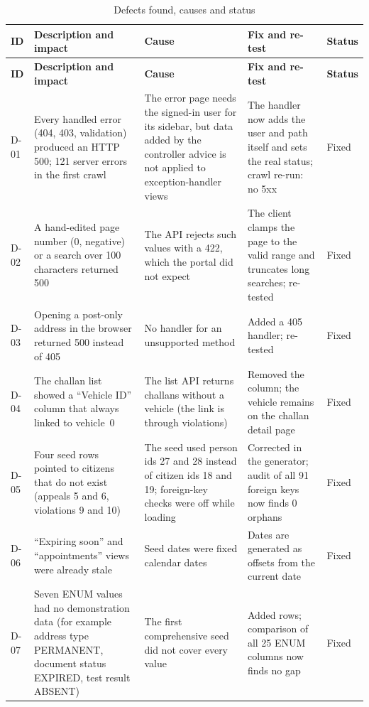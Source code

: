\begingroup\footnotesize
\begin{longtable}{@{}p{0.9cm}p{3.4cm}p{3.7cm}p{3.7cm}p{1.3cm}@{}}
\caption{Defects found, causes and status}\label{tab:defects}\\
\toprule \textbf{ID} & \textbf{Description and impact} & \textbf{Cause} & \textbf{Fix and re-test} & \textbf{Status}\\ \midrule \endfirsthead
\toprule \textbf{ID} & \textbf{Description and impact} & \textbf{Cause} & \textbf{Fix and re-test} & \textbf{Status}\\ \midrule \endhead
\bottomrule \endlastfoot
D-01 & Every handled error (404, 403, validation) produced an HTTP 500; 121 server errors in the first crawl & The error page needs the signed-in user for its sidebar, but data added by the controller advice is not applied to exception-handler views & The handler now adds the user and path itself and sets the real status; crawl re-run: no 5xx & Fixed\\
D-02 & A hand-edited page number (0, negative) or a search over 100 characters returned 500 & The API rejects such values with a 422, which the portal did not expect & The client clamps the page to the valid range and truncates long searches; re-tested & Fixed\\
D-03 & Opening a post-only address in the browser returned 500 instead of 405 & No handler for an unsupported method & Added a 405 handler; re-tested & Fixed\\
D-04 & The challan list showed a ``Vehicle ID'' column that always linked to vehicle~0 & The list API returns challans without a vehicle (the link is through violations) & Removed the column; the vehicle remains on the challan detail page & Fixed\\
D-05 & Four seed rows pointed to citizens that do not exist (appeals 5 and 6, violations 9 and 10) & The seed used person ids 27 and 28 instead of citizen ids 18 and 19; foreign-key checks were off while loading & Corrected in the generator; audit of all 91 foreign keys now finds 0 orphans & Fixed\\
D-06 & ``Expiring soon'' and ``appointments'' views were already stale & Seed dates were fixed calendar dates & Dates are generated as offsets from the current date & Fixed\\
D-07 & Seven ENUM values had no demonstration data (for example address type PERMANENT, document status EXPIRED, test result ABSENT) & The first comprehensive seed did not cover every value & Added rows; comparison of all 25 ENUM columns now finds no gap & Fixed\\

\end{longtable}

